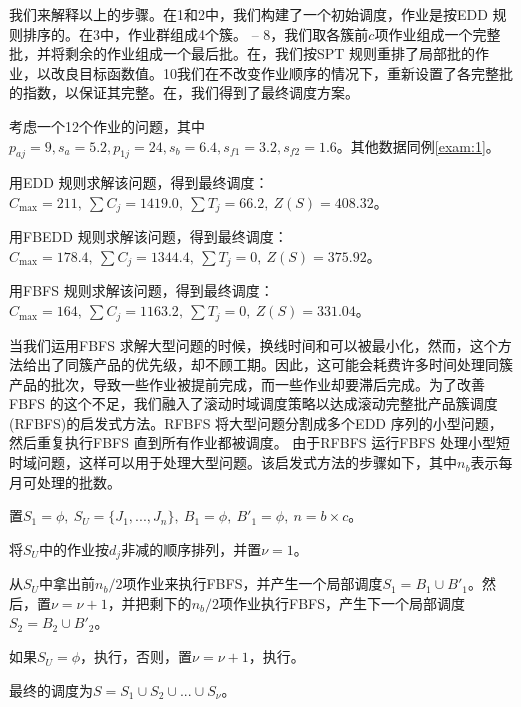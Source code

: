 我们来解释以上的步骤。在\Step1和\Step2中，我们构建了一个初始调度，作业是按EDD 规则排序的。在\Step3中，作业群组成4个簇。 -- 8，我们取各簇前$c$项作业组成一个完整批，并将剩余的作业组成一个最后批。在，我们按SPT 规则重排了局部批的作业，以改良目标函数值。\Step10我们在不改变作业顺序的情况下，重新设置了各完整批的指数，以保证其完整。在，我们得到了最终调度方案。
\begin{example}
考虑一个12个作业的问题，其中$p_{aj}=9,s_a=5.2,p_{1j}=24,s_b=6.4,s_{f1}=3.2,s_{f2}=1.6$。其他数据同例\ref{exam:1}。
\end{example}
\begin{asparaenum}
\renewcommand{\labelenumi}{解\theenumi:}
\item 用EDD 规则求解该问题，得到最终调度：$C_{\max}=211,\ \sum C_j = 1419.0,\ \sum T_j = 66.2,\ Z(S)=408.32$。
\item 用FBEDD 规则求解该问题，得到最终调度：$C_{\max}=178.4,\ \sum C_j = 1344.4,\ \sum T_j = 0,\ Z(S)=375.92$。
\item 用FBFS 规则求解该问题，得到最终调度：$C_{\max}=164,\ \sum C_j = 1163.2,\ \sum T_j = 0,\ Z(S)=331.04$。
\end{asparaenum}
当我们运用FBFS 求解大型问题的时候，换线时间和可以被最小化，然而，这个方法给出了同簇产品的优先级，却不顾工期。因此，这可能会耗费许多时间处理同簇产品的批次，导致一些作业被提前完成，而一些作业却要滞后完成。为了改善FBFS 的这个不足，我们融入了滚动时域调度策略以达成滚动完整批产品簇调度(RFBFS)的启发式方法。RFBFS 将大型问题分割成多个EDD 序列的小型问题，然后重复执行FBFS 直到所有作业都被调度。
由于RFBFS 运行FBFS 处理小型短时域问题，这样可以用于处理大型问题。该启发式方法的步骤如下，其中$n_b$表示每月可处理的批数。
\begin{asparaenum}
\renewcommand{\labelenumi}{\heiti 步骤\theenumi~}
\item 置$S_1 = \phi,\ S_U = \{J_1,...,J_n\},\ B_1 = \phi,\ B'_1 = \phi,\  n = b \times c$。
\item 将$S_U$中的作业按$d_j$非减的顺序排列，并置$\nu = 1$。
\item 从$S_U$中拿出前$n_b/2$项作业来执行FBFS，并产生一个局部调度$S_1 = B_1 \cup B'_1$。然后，置$\nu = \nu + 1$，并把剩下的$n_b/2$项作业执行FBFS，产生下一个局部调度$S_2 = B_2 \cup B'_2$。
\item 如果$S_U=\phi$，执行，否则，置$\nu = \nu + 1$，执行。
\item 最终的调度为$S=S_1\cup S_2\cup...\cup S_{\nu}$。
\end{asparaenum}


